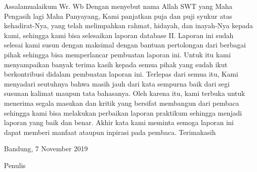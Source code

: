 \begin{acknowledgements}

Assalamualaikum Wr. Wb Dengan menyebut nama Allah SWT yang Maha Pengasih lagi Maha Panyayang, Kami panjatkan puja dan puji syukur atas kehadirat-Nya, yang telah melimpahkan rahmat, hidayah, dan inayah-Nya kepada kami, sehingga kami bisa selesaikan laporan database II.
Laporan ini sudah selesai kami susun dengan maksimal dengan bantuan pertolongan dari berbagai pihak sehingga bisa memperlancar pembuatan laporan ini. Untuk itu kami menyampaikan banyak terima kasih kepada semua pihak yang sudah ikut berkontribusi didalam pembuatan laporan ini. 
Terlepas dari semua itu, Kami menyadari seutuhnya bahwa masih jauh dari kata sempurna baik dari segi susunan kalimat maupun tata bahasanya. Oleh karena itu, kami terbuka untuk menerima segala masukan dan kritik yang bersifat membangun dari pembaca sehingga kami bisa melakukan perbaikan laporan praktikum  sehingga menjadi laporan yang baik dan benar. Akhir kata kami meminta semoga laporan ini dapat memberi manfaat ataupun inpirasi pada pembaca. Terimakasih



\begin{raggedleft}

Bandung, 7 November 2019

Penulis

\end{raggedleft}

\end{acknowledgements}